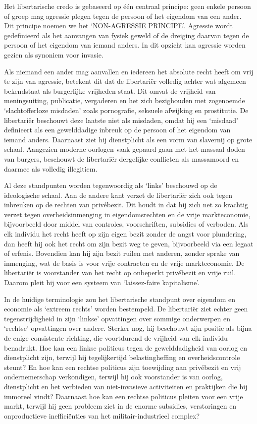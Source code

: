 \documentclass[
  a5paper,
  smalldemyvopaper,10pt,twoside,onecolumn,openright,extrafontsizes,hidelinks]{memoir}
\begin{document}
Het libertarische credo is gebaseerd op één centraal principe: geen
enkele persoon of groep mag agressie plegen tegen de persoon of het
eigendom van een ander. Dit principe noemen we het `NON-AGRESSIE
PRINCIPE'. Agressie wordt gedefinieerd als het aanvangen van fysiek
geweld of de dreiging daarvan tegen de persoon of het eigendom van
iemand anders. In dit opzicht kan agressie worden gezien als synoniem
voor invasie.

Als niemand een ander mag aanvallen en iedereen het absolute recht heeft
om vrij te zijn van agressie, betekent dit dat de libertariër volledig
achter wat algemeen bekendstaat als burgerlijke vrijheden staat. Dit
omvat de vrijheid van meningsuiting, publicatie, vergaderen en het zich
bezighouden met zogenoemde `slachtofferloze misdaden' zoals pornografie,
seksuele afwijking en prostitutie. De libertariër beschouwt deze laatste
niet als misdaden, omdat hij een `misdaad' definieert als een
gewelddadige inbreuk op de persoon of het eigendom van iemand anders.
Daarnaast ziet hij dienstplicht als een vorm van slavernij op grote
schaal. Aangezien moderne oorlogen vaak gepaard gaan met het massaal
doden van burgers, beschouwt de libertariër dergelijke conflicten als
massamoord en daarmee als volledig illegitiem.

Al deze standpunten worden tegenwoordig als `links' beschouwd op de
ideologische schaal. Aan de andere kant verzet de libertariër zich ook
tegen inbreuken op de rechten van privébezit. Dit houdt in dat hij zich
net zo krachtig verzet tegen overheidsinmenging in eigendomsrechten en
de vrije markteconomie, bijvoorbeeld door middel van controles,
voorschriften, subsidies of verboden. Als elk individu het recht heeft
op zijn eigen bezit zonder de angst voor plundering, dan heeft hij ook
het recht om zijn bezit weg te geven, bijvoorbeeld via een legaat of
erfenis. Bovendien kan hij zijn bezit ruilen met anderen, zonder sprake
van inmenging, wat de basis is voor vrije contracten en de vrije
markteconomie. De libertariër is voorstander van het recht op onbeperkt
privébezit en vrije ruil. Daarom pleit hij voor een systeem van
`laissez-faire kapitalisme'.

In de huidige terminologie zou het libertarische standpunt over eigendom
en economie als `extreem rechts' worden bestempeld. De libertariër ziet
echter geen tegenstrijdigheid in zijn `linkse' opvattingen over sommige
onderwerpen en `rechtse' opvattingen over andere. Sterker nog, hij
beschouwt zijn positie als bijna de enige consistente richting, die
voortdurend de vrijheid van elk individu benadrukt. Hoe kan een linkse
politicus tegen de gewelddadigheid van oorlog en dienstplicht zijn,
terwijl hij tegelijkertijd belastingheffing en overheidscontrole steunt?
En hoe kan een rechtse politicus zijn toewijding aan privébezit en vrij
ondernemerschap verkondigen, terwijl hij ook voorstander is van oorlog,
dienstplicht en het verbieden van niet-invasieve activiteiten en
praktijken die hij immoreel vindt? Daarnaast hoe kan een rechtse
politicus pleiten voor een vrije markt, terwijl hij geen probleem ziet
in de enorme subsidies, verstoringen en onproductieve inefficiënties van
het militair-industrieel complex?
\end{document}
